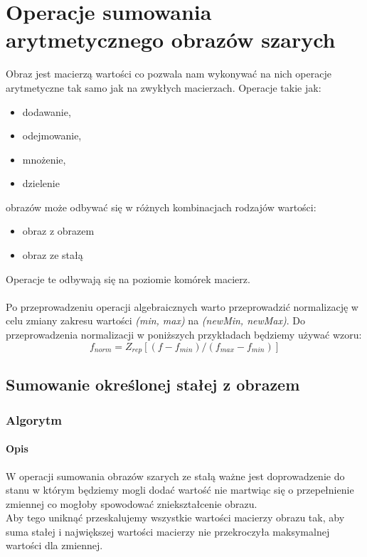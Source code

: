 \documentclass[a4paper,12pt]{book}
\begin{document}
\chapter{Operacje sumowania arytmetycznego obrazów szarych}
Obraz jest macierzą wartości co pozwala nam wykonywać na nich operacje arytmetyczne tak samo jak na zwykłych macierzach. 
Operacje takie jak: 
\renewcommand{\labelitemi}{$*$}
\begin{itemize}
	\item dodawanie,
	\item odejmowanie,
	\item mnożenie,
	\item dzielenie
\end{itemize}
obrazów może odbywać się w różnych kombinacjach rodzajów wartości: 
\renewcommand{\labelitemi}{$*$}
\begin{itemize}
	\item obraz z obrazem
	\item obraz ze stałą
\end{itemize}
Operacje te odbywają się na poziomie komórek macierz. 
\\\\
Po przeprowadzeniu operacji algebraicznych warto przeprowadzić normalizację w celu zmiany zakresu wartości \textit{(min, max)} na \textit{(newMin, newMax)}. 
Do przeprowadzenia normalizacji w poniższych przykładach będziemy używać wzoru: 
\[f_{norm}=Z_{rep}[(f-f_{min})/(f_{max}-f_{min})]\]

\section{Sumowanie określonej stałej z obrazem}
\subsection*{Algorytm}
\subsubsection*{Opis}
W operacji sumowania obrazów szarych ze stałą ważne jest doprowadzenie do stanu w którym będziemy mogli dodać wartość 
nie martwiąc się o przepełnienie zmiennej co mogłoby spowodować zniekształcenie obrazu. \\
Aby tego uniknąć przeskalujemy wszystkie wartości macierzy obrazu tak, aby suma stałej i największej wartości macierzy 
nie przekroczyła maksymalnej wartości dla zmiennej. 
\end{document}
